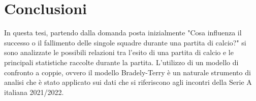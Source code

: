 \chapter{Conclusioni}
\label{cap:conclusioni}

In questa tesi, partendo dalla domanda posta inizialmente "Cosa influenza il successo o il fallimento delle singole squadre durante una partita di calcio?" si sono analizzate le possibili relazioni tra l'esito di una partita di calcio e le principali statistiche raccolte durante la partita. L'utilizzo di un modello di confronto a coppie, ovvero il modello Bradely-Terry è un naturale strumento di analisi che è stato applicato sui dati che si riferiscono agli incontri della Serie A italiana 2021/2022.\\
\begin{comment}
	L'analisi, attraverso strumenti grafici, inizia con lo studio dei dati individuando le possibili relazioni tra l'esito della partita e le singole 29 variabili esplicative, e le possibili interazioni tra covariate. Successivamente ad alcune operazioni di \emph{prepocessing}, l'analisi è continuata con la modellazione dei modelli Bradley-Terry. La modellazione parte con il modello Bradley-Terry standard per stimare l'abilità delle singole squadre e l'effetto di giocare in casa per poi spingersi sempre più in profondità, introducendo 26 variabili esplicative fino a analizzarne il loro effetto sulle partite per ogni singola squadra. Successivamente, per verificare che l'uso dei dati è stato svolto correttamente, si è svolto l'attività di predizione con i modelli confrontando le loro predizioni con le predizioni fatte dai \emph{bookmakers}. Per rendere il lavoro di tesi più completo e approfondito, l'analisi è passata allo studio delle predizioni fatte da metodi di apprendimento automatico ovvero, il K-Nearest-Neighbors (K-NN), la Support Vector Machine (SVM), il Decision Tree, la Random Forest e l'AdaBoost. Dopo un breve confronto tra i vari metodi di \emph{machine learning} dal punto di vista delle prestazioni registrate durante la fase di predizione, i metodi di apprendimento automatico sono stati utilizzati come riferimento dal punto di vista dell'accuratezza, della precisione, della sensibilità e della specificità, per valutare la bontà dei modelli BT in fase di predizione. Successivamente, l'analisi prosegue confrontando i metodi Decision Tree e Random Forest con i modelli BT, sull'identificazione delle statistiche che influenzano l'esito di una partita. Infine, per un maggior approfondimento, è stato riapplicato il modello BT con covariate specifiche per ogni partita e per ogni squadra, estendendo la variabile risposta da tre a cinque categorie, ottenendo un risultato più raffinato ma in linea con quanto ricavato precedentemente.\\
\end{comment}
